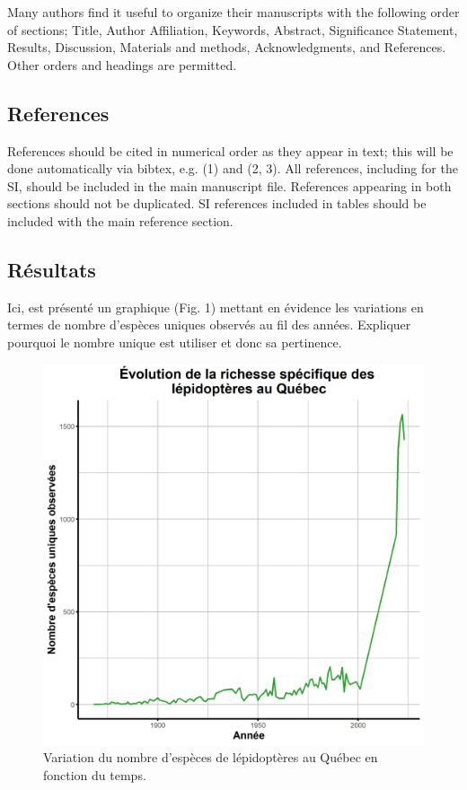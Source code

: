 \documentclass[9pt,twocolumn,twoside,]{pnas-new}
\begin{document}
Many authors find it useful to organize their manuscripts with the
following order of sections; Title, Author Affiliation, Keywords,
Abstract, Significance Statement, Results, Discussion, Materials and
methods, Acknowledgments, and References. Other orders and headings are
permitted.

\subsection*{References}\label{references}

References should be cited in numerical order as they appear in text;
this will be done automatically via bibtex, e.g. (1) and (2, 3). All
references, including for the SI, should be included in the main
manuscript file. References appearing in both sections should not be
duplicated. SI references included in tables should be included with the
main reference section.

\subsection*{Résultats}\label{Ruxe9sultats}

Ici, est présenté un graphique (Fig. 1) mettant en évidence les
variations en termes de nombre d'espèces uniques observés au fil des
années. Expliquer pourquoi le nombre unique est utiliser et donc sa
pertinence.

\begin{figure}
\includegraphics[width=0.9\linewidth]{../Figures_analyse/graphique_biodiversite} \caption{Variation du nombre d'espèces de lépidoptères au Québec en fonction du temps.}\label{fig:fig_graphique_biodiversite}
\end{figure}
\end{document}
